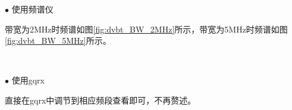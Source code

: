 		\par $\bullet$ 使用频谱仪
		\par 带宽为2MHz时频谱如图\ref{fig:dvbt_BW_2MHz}所示，带宽为5MHz时频谱如图\ref{fig:dvbt_BW_5MHz}所示。
		\begin{figure}[htp]
			\centering
			 \\
		\end{figure}
		\par $\bullet$ 使用gqrx
		\par 直接在gqrx中调节到相应频段查看即可，不再赘述。
